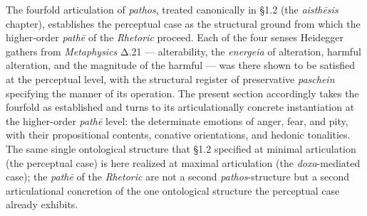 \documentclass{article}
\begin{document}
The fourfold articulation of \textit{pathos}, treated canonically in \S1.2 (the \textit{aisth\=esis} chapter), establishes the perceptual case as the structural ground from which the higher-order \textit{path\=e} of the \textit{Rhetoric} proceed. Each of the four senses Heidegger gathers from \textit{Metaphysics} Δ.21 --- alterability, the \textit{energeia} of alteration, harmful alteration, and the magnitude of the harmful --- was there shown to be satisfied at the perceptual level, with the structural register of preservative \textit{paschein} specifying the manner of its operation. The present section accordingly takes the fourfold as established and turns to its articulationally concrete instantiation at the higher-order \textit{path\=e} level: the determinate emotions of anger, fear, and pity, with their propositional contents, conative orientations, and hedonic tonalities. The same single ontological structure that \S1.2 specified at minimal articulation (the perceptual case) is here realized at maximal articulation (the \textit{doxa}-mediated case); the \textit{path\=e} of the \textit{Rhetoric} are not a second \textit{pathos}-structure but a second articulational concretion of the one ontological structure the perceptual case already exhibits.
\end{document}
